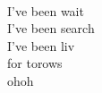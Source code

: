  \\
\songwordfb{} I've been wait \\
\songwordfb{}I've been search \\
\songwordfb{} I've been liv \\
for torows \\
ohoh
